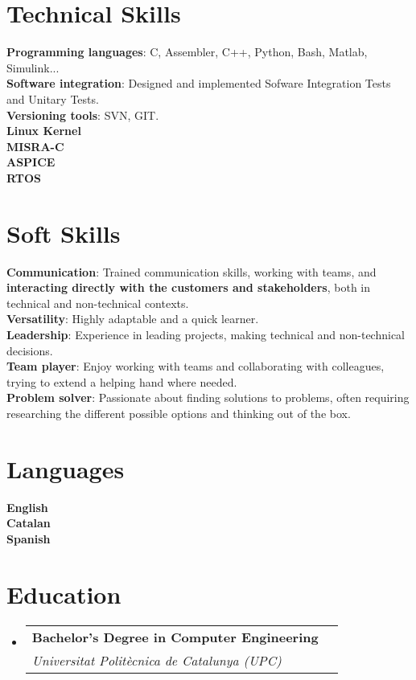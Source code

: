 \documentclass[letterpaper,11pt]{article}
\makeatletter
\newcommand{\resumeSubheading}[4]{
  \vspace{-2pt}\item
    \begin{tabular*}{0.97\textwidth}[t]{l@{\extracolsep{\fill}}r}
      \textbf{#1} & #2 \\
      \textit{\small#3} & \textit{\small #4} \\
    \end{tabular*}\vspace{-7pt}
}
\newcommand{\resumeSubHeadingListStart}{\begin{itemize}[leftmargin=0.15in, label={}]}
\newcommand{\resumeSubHeadingListEnd}{\end{itemize}}
\makeatother
\begin{document}
%
\section{Technical Skills}
 \begin{itemize}[leftmargin=0.15in, label={}]
    \small{\item{
     \textbf{Programming languages}{: C, Assembler, C++, Python, Bash, Matlab, Simulink...} \\
     \textbf{Software integration}{: Designed and implemented Sofware Integration Tests and Unitary Tests.} \\
     \textbf{Versioning tools}{: SVN, GIT.} \\
     \textbf{Linux Kernel}{} \\
     \textbf{MISRA-C}{} \\
     \textbf{ASPICE}{} \\
     \textbf{RTOS}{} \\

    }}
 \end{itemize}

\section{Soft Skills}
 \begin{itemize}[leftmargin=0.15in, label={}]
    \small{\item{
     \textbf{Communication}{: Trained communication skills, working with teams, and \textbf{interacting directly with the customers and stakeholders}, both in technical and non-technical contexts. } \\
     \textbf{Versatility}{: Highly adaptable and a quick learner.} \\
     \textbf{Leadership}{: Experience in leading projects, making technical and non-technical decisions.} \\
     \textbf{Team player}{: Enjoy working with teams and collaborating with colleagues, trying to extend a helping hand where needed.} \\
     \textbf{Problem solver}{: Passionate about finding solutions to problems, often requiring researching the different possible options and thinking out of the box.} \\
    }}
 \end{itemize}

\section{Languages}
 \begin{itemize}[leftmargin=0.15in, label={}]
    \small{\item{
     \textbf{English}{ } \\
     \textbf{Catalan}{ } \\
     \textbf{Spanish}{ } \\
    }}
 \end{itemize}

\section{Education}
  \resumeSubHeadingListStart
    \resumeSubheading
      {Bachelor's Degree in Computer Engineering}{}
      {Universitat Politècnica de Catalunya (UPC)}{}
  \resumeSubHeadingListEnd


\end{document}
